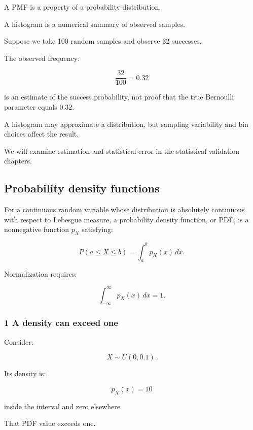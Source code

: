 \hypertarget{02-foundations-ii-ch023-a-pmf-is-not-a-histogram}{}

A PMF is a property of a probability distribution.

A histogram is a numerical summary of observed samples.

Suppose we take 100 random samples and observe 32 successes.

The observed frequency:

\[
 \frac{32}{100}=0.32
\]

is an estimate of the success probability, not proof that the true Bernoulli parameter equals \(0.32\).

A histogram may approximate a distribution, but sampling variability and bin choices affect the result.

We will examine estimation and statistical error in the statistical validation chapters.

\subsection{Probability density functions}\label{02-foundations-ii-ch023-probability-density-functions}

\hypertarget{02-foundations-ii-ch023-probability-density-functions}{}

For a continuous random variable whose distribution is absolutely continuous with respect to Lebesgue measure, a probability density function, or PDF, is a nonnegative function \(p_X\) satisfying:

\[
 \boxed{ P(a\le X\le b) = \int_a^bp_X(x)\,dx }.
\]

Normalization requires:

\[
 \boxed{ \int_{-\infty}^{\infty}p_X(x)\,dx=1 }.
\]

\subsubsection{1 A density can exceed one}\label{02-foundations-ii-ch023-a-density-can-exceed-one}

\hypertarget{02-foundations-ii-ch023-a-density-can-exceed-one}{}

Consider:

\[
 X\sim U(0,0.1).
\]

Its density is:

\[
 p_X(x)=10
\]

inside the interval and zero elsewhere.

That PDF value exceeds one.

